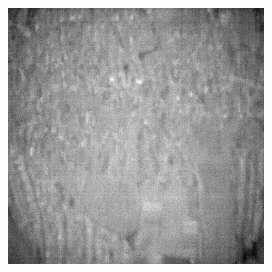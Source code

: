 \documentclass[10pt,twocolumn,letterpaper]{article}
\begin{document}
\begin{figure}[!ht]
\begin{subfigure}[b]{0.19\textwidth}
  \end{subfigure}
  \hfill
  \begin{subfigure}[b]{0.19\textwidth}
      \centering
      \includegraphics[width=\textwidth]{../figs/outputs/mono/230.png}
  \end{subfigure}      
  

\end{figure}
\end{document}
